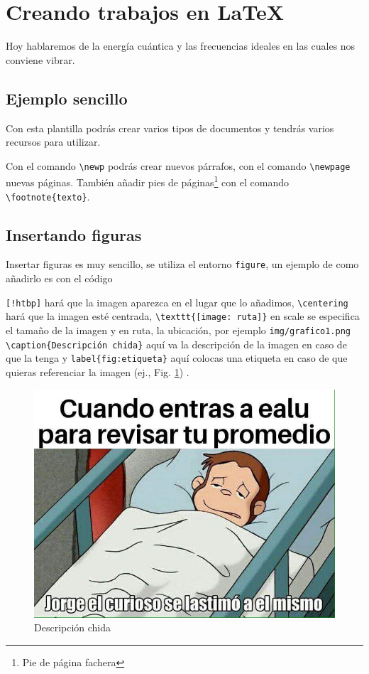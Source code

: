 
\section{Creando trabajos en \LaTeX}

Hoy hablaremos de la energía cuántica y las frecuencias ideales en las cuales nos conviene vibrar.

\subsection{Ejemplo sencillo}

Con esta plantilla podrás crear varios tipos de documentos y tendrás varios recursos para utilizar. 

\newp Con el comando \verb|\newp| podrás crear nuevos párrafos, con el comando  \verb|\newpage| nuevas páginas. También añadir pies de páginas\footnote{Pie de página fachera} con el comando \verb|\footnote{texto}|.

\subsection{Insertando figuras}
Insertar figuras es muy sencillo, se utiliza el entorno \verb|figure|, un ejemplo de como añadirlo es con el código


\newp \verb|[!htbp]| hará que la imagen aparezca en el lugar que lo añadimos, \verb|\centering| hará que la imagen esté centrada, \verb|\texttt{[image: ruta]}| en scale se especifica el tamaño de la imagen y en ruta, la ubicación, por ejemplo \verb|img/grafico1.png| \verb|\caption{Descripción chida}| aquí va la descripción de la imagen en caso de que la tenga y \verb|label{fig:etiqueta}| aquí colocas una etiqueta en caso de que quieras referenciar la imagen (ej., Fig. \ref{fig:figura1}) .

\begin{figure}[!htbp]
    \centering
    \includegraphics[scale=0.28]{img/grafico1.jpg}
    \caption{Descripción chida}
    \label{fig:figura1}
\end{figure}

